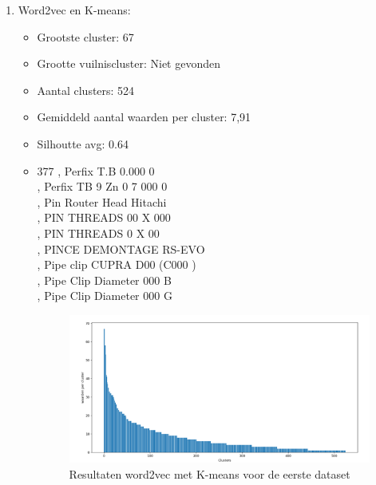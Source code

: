 \begin{enumerate}
\item Word2vec en K-means:
\begin{itemize}
    \item Grootste cluster: 67
    \item Grootte vuilniscluster: Niet gevonden
    \item Aantal clusters: 524
    \item Gemiddeld aantal waarden per cluster: 7,91
    \item Silhoutte avg:  0.64
    \item
    377 , Perfix T.B 0.000 0
    \\ , Perfix TB 9 Zn 0 7 000 0
    \\ , Pin Router Head Hitachi
    \\ , PIN THREADS 00 X 000
    \\ , PIN THREADS 0 X 00
    \\ , PINCE DEMONTAGE RS-EVO
    \\ , Pipe clip CUPRA D00 (C000 )
    \\ , Pipe Clip Diameter 000  B
    \\ , Pipe Clip Diameter 000  G
    \begin{figure}[h]
        \centering
        \includegraphics[width=0.7\linewidth]{../foto's/datakmeansword2vec}
        \caption{Resultaten word2vec met K-means voor de eerste dataset}
        \label{fig:dataset1_word2vec_kmeans}
    \end{figure}
\end{itemize}
\newpage


\end{enumerate}
